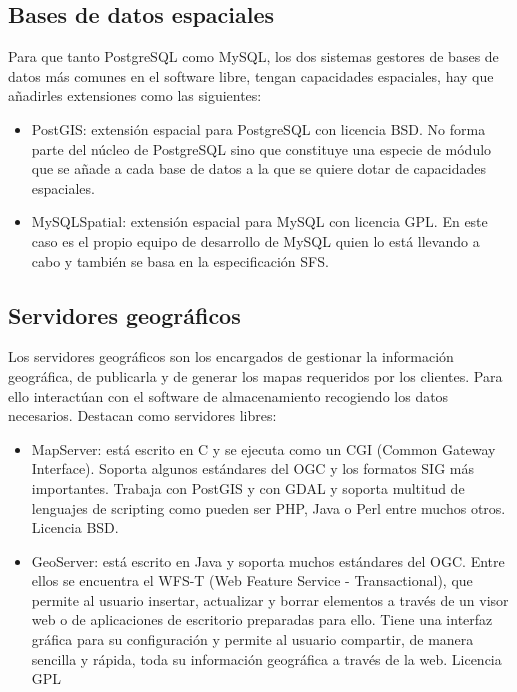 \subsection{Bases de datos espaciales}
    Para que tanto PostgreSQL como MySQL, los dos sistemas gestores de bases
    de datos más comunes en el software libre, tengan capacidades espaciales, hay que
    añadirles extensiones como las siguientes:
    \begin{itemize}
        \item PostGIS: extensión espacial para PostgreSQL con licencia BSD. No forma
    parte del núcleo de PostgreSQL sino que constituye una especie de módulo
    que se añade a cada base de datos a la que se quiere dotar de capacidades
    espaciales.
        \item  MySQLSpatial: extensión espacial para MySQL con licencia GPL. En este caso
    es el propio equipo de desarrollo de MySQL quien lo está llevando a cabo y
    también se basa en la especificación SFS.
    \end{itemize}
    
\subsection{Servidores geográficos}
    Los servidores geográficos son los encargados de gestionar la información geográfica, de publicarla y de generar los mapas requeridos por los clientes. Para ello
    interactúan con el software de almacenamiento recogiendo los datos necesarios. Destacan como servidores libres:
    \begin{itemize}
        \item MapServer: está escrito en C y se ejecuta como un CGI (Common Gateway
    Interface). Soporta algunos estándares del OGC y los formatos SIG más importantes. Trabaja con PostGIS y con GDAL y soporta multitud de lenguajes
    de scripting como pueden ser PHP, Java o Perl entre muchos otros. Licencia
    BSD.
        \item GeoServer: está escrito en Java y soporta muchos estándares del OGC. Entre
    ellos se encuentra el WFS-T (Web Feature Service - Transactional), que permite al usuario insertar, actualizar y borrar elementos a través de un visor web
    o de aplicaciones de escritorio preparadas para ello. Tiene una interfaz gráfica
    para su configuración y permite al usuario compartir, de manera sencilla y
    rápida, toda su información geográfica a través de la web. Licencia GPL
    \end{itemize}

    
    
 
 
